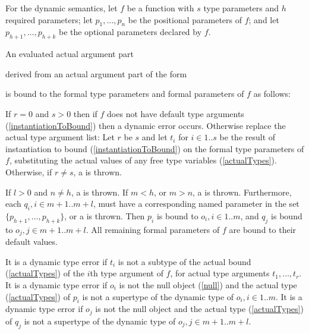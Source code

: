 \documentclass[makeidx]{article}
\begin{document}
{\LMHash{}%
For the dynamic semantics,
let $f$ be a function with $s$ type parameters and $h$ required parameters;
let $p_1, \ldots, p_n$ be the positional parameters of $f$;
and let $p_{h+1}, \ldots, p_{h+k}$ be the optional parameters declared by $f$.

\LMHash{}%
An evaluated actual argument part

\noindent
{}

\noindent
derived from an actual argument part of the form

\noindent
{}

\noindent
is bound to the formal type parameters and formal parameters of $f$ as follows:

\LMHash{}%
If $r = 0$ and $s > 0$ then
if $f$ does not have default type arguments
(\ref{instantiationToBound})
then a dynamic error occurs.
Otherwise replace the actual type argument list:
Let $r$ be $s$ and let $t_i$ for $i \in 1 .. s$ be the result of
instantiation to bound
(\ref{instantiationToBound})
on the formal type parameters of $f$,
substituting the actual values of any free type variables
(\ref{actualTypes}).
Otherwise, if $r \not= s$, a  is thrown.

\LMHash{}%
If $l > 0$ and $n \not= h$, a  is thrown.
If $m < h$, or $m > n$, a  is thrown.
Furthermore, each
$q_i, i \in m + 1 .. m + l$,
must have a corresponding named parameter in the set
$\{p_{h+1}, \ldots, p_{h+k}\}$,
or a  is thrown.
Then $p_i$ is bound to
$o_i, i \in 1 .. m$,
and $q_j$ is bound to $o_j, j \in m + 1 .. m + l$.
All remaining formal parameters of $f$ are bound to their default values.


\LMHash{}%
It is a dynamic type error if $t_i$ is not a subtype of the actual bound
(\ref{actualTypes})
of the $i$th type argument of $f$, for actual type arguments $t_1, \ldots, t_r$.
It is a dynamic type error if $o_i$ is not the null object (\ref{null})
and the actual type
(\ref{actualTypes})
of $p_i$ is not a supertype of the dynamic type of $o_i, i \in 1 .. m$.
It is a dynamic type error if $o_j$ is
not the null object and the actual type
(\ref{actualTypes})
of $q_j$ is not a supertype of the dynamic type of $o_j, j \in m + 1 .. m + l$.


}
\end{document}
